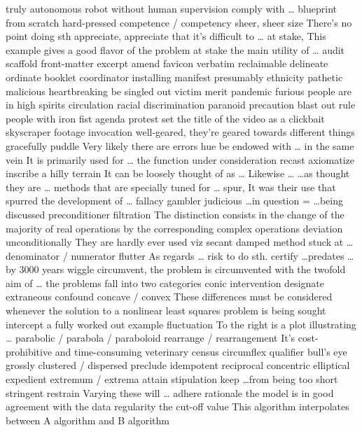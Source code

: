 \documentclass[12pt]{article}
\begin{document}
truly autonomous robot 
without human supervision 
comply with \dots 
blueprint 
from scratch 
hard-pressed 
competence / competency 
sheer, sheer size 
There's no point doing sth 
appreciate, appreciate that it's difficult to \dots 
at stake, This example gives a good flavor of the problem at stake 
the main utility of \dots 
audit 
scaffold 
front-matter 
excerpt 
amend 
favicon 
verbatim 
reclaimable 
delineate 
ordinate 
booklet 
coordinator 
installing manifest 
presumably 
ethnicity 
pathetic 
malicious 
heartbreaking 
be singled out 
victim 
merit 
pandemic 
furious 
people are in high spirits 
circulation 
racial discrimination 
paranoid 
precaution 
blast out 
rule people with iron fist 
agenda 
protest 
set the title of the video as a clickbait 
skyscraper 
footage 
invocation 
well-geared, they're geared towards different things 
gracefully 
puddle 
Very likely there are errors 
hue 
be endowed with \dots 
in the same vein 
It is primarily used for \dots 
the function under consideration 
recast 
axiomatize 
inscribe 
a hilly terrain 
It can be loosely thought of as \dots 
Likewise \dots 
\dots as thought they are \dots 
methods that are specially tuned for \dots 
spur, It was their use that spurred the development of \dots 
fallacy 
gambler
judicious
\dots in question = \dots being discussed 
preconditioner 
filtration 
The distinction consists in the change of the majority of real operations by the corresponding complex operations 
deviation 
unconditionally 
They are hardly ever used 
viz 
secant 
damped method 
stuck at \dots 
denominator / numerator 
flutter 
As regards \dots 
risk to do sth. 
certify 
\dots predates \dots by 3000 years 
wiggle 
circumvent, the problem is circumvented 
with the twofold aim of \dots 
the problems fall into two categories 
conic 
intervention 
designate 
extraneous 
confound 
concave / convex 
These differences must be considered whenever the solution to a nonlinear least squares problem is being sought 
intercept 
a fully worked out example 
fluctuation 
To the right is a plot illustrating \dots 
parabolic / parabola / paraboloid 
rearrange / rearrangement 
It's cost-prohibitive and time-consuming
veterinary 
census 
circumflex 
qualifier 
bull's eye 
grossly 
clustered / dispersed 
preclude 
idempotent 
reciprocal 
concentric 
elliptical 
expedient 
extremum / extrema 
attain 
stipulation 
keep \dots from being too short
stringent 
restrain 
Varying these will \dots 
adhere 
rationale 
the model is in good agreement with the data 
regularity 
the cut-off value 
This algorithm interpolates between A algorithm and B algorithm 
\end{document}
